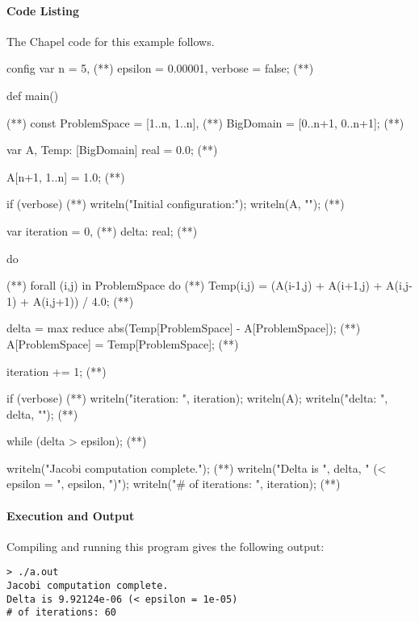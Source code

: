\paragraph{Code Listing}
The Chapel code for this example follows.  
\begin{numberedchapel}
config var n = 5,                  (*\label{jac_config_start}*)
           epsilon = 0.00001,
           verbose = false;        (*\label{jac_config_end}*)

def main() {                       (*\label{jac_main}*)
  const ProblemSpace = [1..n, 1..n],  (*\label{problem_space}*)
        BigDomain = [0..n+1, 0..n+1]; (*\label{big_domain}*)

  var A, Temp: [BigDomain] real = 0.0; (*\label{a_temp_decl}*)

  A[n+1, 1..n] = 1.0;                 (*\label{a_init_last_row}*)

  if (verbose) {                      (*\label{verbose_init_start}*)
    writeln("Initial configuration:");
    writeln(A, "\n");
  }                                   (*\label{verbose_init_end}*)

  var iteration = 0,                  (*\label{jac_var_start}*)
      delta: real;                    (*\label{jac_var_end}*)

  do {                                (*\label{jac_do_start}*)
    forall (i,j) in ProblemSpace do   (*\label{jac_forall}*)
      Temp(i,j) = (A(i-1,j) + A(i+1,j) + A(i,j-1) + A(i,j+1)) / 4.0; (*\label{jac_iter}*)

    delta = max reduce abs(Temp[ProblemSpace] - A[ProblemSpace]); (*\label{jac_reduce}*)
    A[ProblemSpace] = Temp[ProblemSpace]; (*\label{jac_update_A}*)

    iteration += 1; (*\label{jac_advance_iteration}*)

    if (verbose) {  (*\label{verbose_iter_start}*)
      writeln("iteration: ", iteration);
      writeln(A);
      writeln("delta: ", delta, "\n");
    }               (*\label{verbose_iter_end}*)
  } while (delta > epsilon);          (*\label{jac_do_end}*)

  writeln("Jacobi computation complete.");  (*\label{jac_output_start}*)
  writeln("Delta is ", delta, " (< epsilon = ", epsilon, ")");
  writeln("# of iterations: ", iteration); (*\label{jac_output_end}*)
}
\end{numberedchapel}

\paragraph{Execution and Output}
Compiling and running this program gives the following output:
\small{
\begin{verbatim}
> ./a.out
Jacobi computation complete.
Delta is 9.92124e-06 (< epsilon = 1e-05)
# of iterations: 60
\end{verbatim}}

